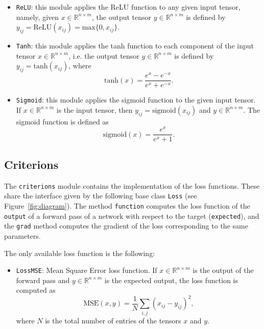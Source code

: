 \documentclass[10pt,final,a4paper]{article}
\begin{document}
\begin{itemize}
\begin{itemize}[label={$\diamond$}]
\item \verb|ReLU|:  this module applies the ReLU function to any given input tensor, namely, given $x \in \mathbb{R}^{n \times m}$, the output tensor $y \in \mathbb{R}^{n \times m}$ is defined by $y_{ij} = \text{ReLU}(x_{ij}) = \text{max}\{0, x_{ij}\}$.
\item \verb|Tanh|: this module applies the tanh function to each component of the input tensor $x \in \mathbb{R}^{n \times m}$, i.e. the output tensor  $y \in \mathbb{R}^{n \times m}$ is defined by $y_{ij} = \text{tanh}(x_{ij})$, where
\begin{equation*}
\text{tanh}(x) = \dfrac{e^x - e^{-x}}{e^{x} + e^{-x}}.
\end{equation*}
\item \verb|Sigmoid|: this module applies the sigmoid function to the given input tensor. If $x \in \mathbb{R}^{n \times m}$ is the input tensor, then $y_{ij} = \text{sigmoid}(x_{ij})$ and $y \in \mathbb{R}^{n \times m}$. The sigmoid function is defined as
\begin{equation*}
\text{sigmoid}(x) = \dfrac{e^x}{e^x + 1}.
\end{equation*}
\end{itemize}
\end{itemize}
\subsection{Criterions}
The \verb|criterions| module contains the implementation of the loss functions. These share the interface given by the following base class \verb|Loss| (see Figure~\ref{fig:diagram}). The method \verb|function| computes the loss function of the \verb|output| of a forward pass of a network with respect to the target (\verb|expected|), and the \verb|grad| method computes the gradient of the loss corresponding to the same parameters.

The only available loss function is the following:
\begin{itemize}
\item \verb|LossMSE|: Mean Square Error loss function. If $x \in \mathbb{R}^{n \times m}$ is the output of the forward pass and $y \in \mathbb{R}^{n \times m}$ is the expected output, the loss function is computed as
\begin{equation*}
\text{MSE}(x,y) = \dfrac{1}{N} \sum_{i,j} (x_{ij} - y_{ij})^2,
\end{equation*} 
where $N$ is the total number of entries of the tensors $x$ and $y$.
\end{itemize}
\end{document}
